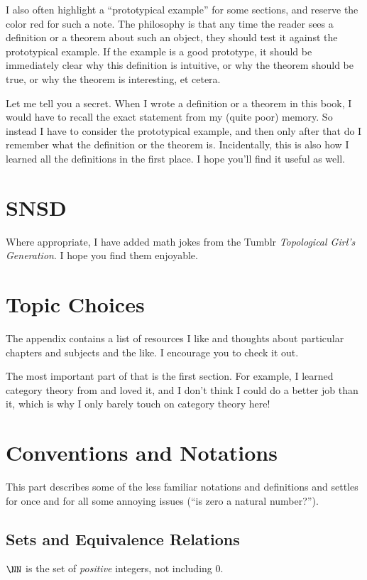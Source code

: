 I also often highlight a ``prototypical example'' for some sections,
and reserve the color red for such a note.
The philosophy is that any time the reader sees a definition
or a theorem about such an object, they should test it
against the prototypical example.
If the example is a good prototype, it should be immediately clear
why this definition is intuitive, or why the theorem should be true,
or why the theorem is interesting, et cetera.

Let me tell you a secret.  When I wrote a definition or a theorem in this book,
I would have to recall the exact statement from my (quite poor) memory. 
So instead I have to consider the prototypical example,
and then only after that do I remember what the definition or the theorem is.
Incidentally, this is also how I learned all the definitions in the first place.
I hope you'll find it useful as well.

\section{SNSD}
Where appropriate, I have added math jokes from the
Tumblr \emph{Topological Girl's Generation}.
I hope you find them enjoyable.

\section{Topic Choices}
The appendix contains a list of resources I like and thoughts about
particular chapters and subjects and the like.
I encourage you to check it out.

The most important part of that is the first section.
For example, I learned category theory from \cite{ref:msci} and loved it,
and I don't think I could do a better job than it,
which is why I only barely touch on category theory here!

\section{Conventions and Notations}
This part describes some of the less familiar notations and definitions
and settles for once and for all some annoying issues (``is zero a natural number?'').

\subsection*{Sets and Equivalence Relations}
$\NN$ is the set of \emph{positive} integers, not including $0$.

